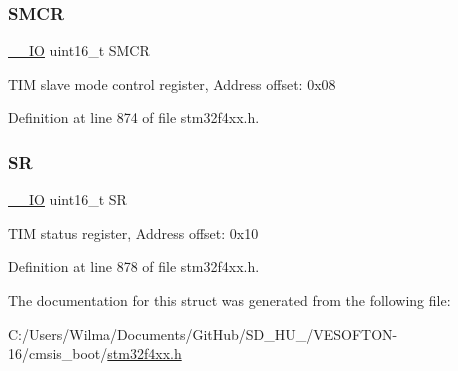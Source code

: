 \mbox{\label{struct_t_i_m___type_def_a02758713abfe580460dd5bcd8762702a}} 
\subsubsection{\texorpdfstring{S\+M\+CR}{SMCR}}
{\footnotesize\ttfamily \hyperlink{group___c_m_s_i_s__core__definitions_gaec43007d9998a0a0e01faede4133d6be}{\+\_\+\+\_\+\+IO} uint16\+\_\+t S\+M\+CR}

T\+IM slave mode control register, Address offset\+: 0x08 

Definition at line 874 of file stm32f4xx.\+h.

\mbox{\label{struct_t_i_m___type_def_a44962ea5442d203bf4954035d1bfeb9d}} 
\subsubsection{\texorpdfstring{SR}{SR}}
{\footnotesize\ttfamily \hyperlink{group___c_m_s_i_s__core__definitions_gaec43007d9998a0a0e01faede4133d6be}{\+\_\+\+\_\+\+IO} uint16\+\_\+t SR}

T\+IM status register, Address offset\+: 0x10 

Definition at line 878 of file stm32f4xx.\+h.



The documentation for this struct was generated from the following file\+:\begin{DoxyCompactItemize}
\item 
C\+:/\+Users/\+Wilma/\+Documents/\+Git\+Hub/\+S\+D\+\_\+\+H\+U\+\_/\+V\+E\+S\+O\+F\+T\+O\+N-\/16/cmsis\+\_\+boot/\hyperlink{stm32f4xx_8h}{stm32f4xx.\+h}\end{DoxyCompactItemize}
